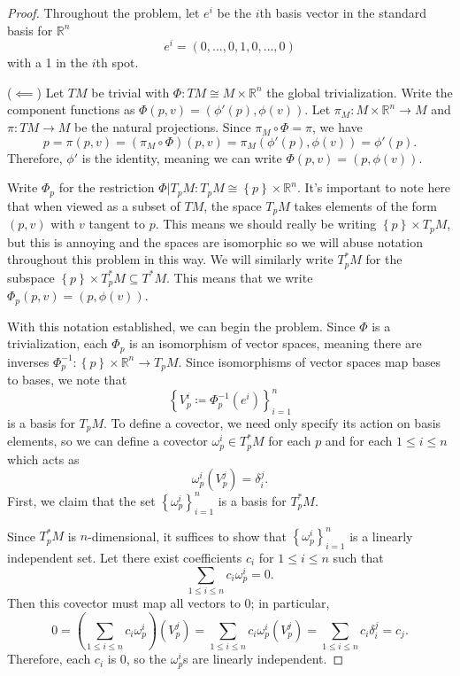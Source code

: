 \documentclass[11pt, letterpaper]{article}
\begin{document}
\begin{proof}
	Throughout the problem, let $e^i$ be the $i$th basis vector in the standard basis for $\mathbb{R} ^n$
	\[
		e^i = (0, \ldots , 0,1,0, \ldots ,0)
	\]
	with a 1 in the $i$th spot.

	($\impliedby $) Let $TM$ be trivial with $\Phi : TM \cong M\times \mathbb{R} ^n$ the global trivialization. Write the component functions as $\Phi (p,v)=(\phi'(p),\phi (v))$. Let $\pi _M : M\times \mathbb{R} ^n \to M$ and $\pi : TM \to M$ be the natural projections. Since $\pi _M \circ \Phi =\pi $, we have
	\[
		p = \pi (p,v) = (\pi _M \circ \Phi )(p,v)=\pi _M(\phi'(p),\phi (v)) = \phi'(p)
	.\]
	Therefore, $\phi '$ is the identity, meaning we can write $\Phi (p,v)=(p,\phi (v))$.

	Write $\Phi _p$ for the restriction $\Phi |T_pM : T_pM \cong \left\{ p \right\} \times \mathbb{R} ^n$. It's important to note here that when viewed as a subset of $TM$, the space $T_pM$ takes elements of the form $(p,v)$ with $v$ tangent to $p$. This means we should really be writing $\left\{ p \right\} \times T_pM$, but this is annoying and the spaces are isomorphic so we will abuse notation throughout this problem in this way. We will similarly write $T_p^*M$ for the subspace $\left\{ p \right\} \times T_p^*M \subseteq T^*M$. This means that we write $\Phi _p(p,v)=(p,\phi (v))$.

	With this notation established, we can begin the problem. Since $\Phi $ is a trivialization, each $\Phi _p$ is an isomorphism of vector spaces, meaning there are inverses $\Phi _p ^{-1} : \left\{ p \right\} \times \mathbb{R} ^n \to T_pM$. Since isomorphisms of vector spaces map bases to bases, we note that
	\[
		\left\{ V_p^i \coloneqq \Phi ^{-1} _p(e^i) \right\}_{i=1} ^n
	\]
	is a basis for $T_pM$. To define a covector, we need only specify its action on basis elements, so we can define a covector $\omega^i_p\in T_p^*M$ for each $p$ and for each $1\leq i\leq n$ which acts as
	\[
		\omega^i_p(V^j_p)=\delta _i^j
	.\]
	First, we claim that the set $\left\{ \omega _p^i \right\}_{i=1} ^n$ is a basis for $T_p^*M$.

	Since $T_p^*M$ is $n$-dimensional, it suffices to show that $\left\{ \omega _p^i \right\}_{i=1} ^n$ is a linearly independent set. Let there exist coefficients $c_i$ for $1\leq i\leq n$ such that
	\[
		\sum_{1\leq i\leq n} c_i\omega _p^i=0
	.\]
	Then this covector must map all vectors to 0; in particular,
	\[
		0=\left( \sum_{1\leq i\leq n} c_i\omega _p^i \right) (V^j_p)=\sum_{1\leq i\leq n} c_i\omega _p^i(V^j_p)=\sum_{1\leq i\leq n} c_i\delta _i^j = c_j
	.\]
	Therefore, each $c_i$ is 0, so the $\omega _p^i$s are linearly independent.



\end{proof}
\end{document}
